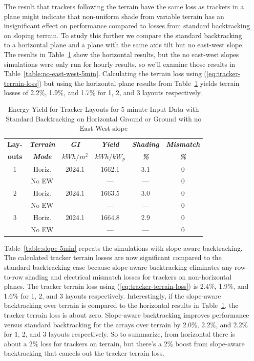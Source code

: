 \documentclass[conference]{IEEEtran}
\begin{document}
The result that trackers following the terrain have the same loss as trackers in a plane might indicate that non-uniform shade from variable terrain has an insignificant effect on performance compared to losses from standard backtracking on sloping terrain. To study this further we compare the standard backtracking to a horizontal plane and a plane with the same axis tilt but no east-west slope. The results in Table~\ref{table:horizontal-5min} show the horizontal results, but the no east-west slopes simulations were only run for hourly results, so we'll examine those results in Table~\ref{table:no-east-west-5min}. Calculating the terrain loss using (\ref{eq:tracker-terrain-loss}) but using the horizontal plane results from Table~\ref{table:horizontal-5min} yields terrain losses of 2.2\%, 1.9\%, and 1.7\% for 1, 2, and 3 layouts respectively.

\begin{table}[htbp]
\caption{Energy Yield for Tracker Layouts for 5-minute Input Data with Standard Backtracking on Horizontal Ground or Ground with no East-West slope}
\begin{center}
\begin{tabular}{|c|c|c|c|c|c|}
\hline
\textbf{Lay-}& \textbf{\textit{Terrain}}& \textbf{\textit{GI}}&        \textbf{\textit{Yield}}&        \textbf{\textit{Shading}}& \textbf{\textit{Mismatch}} \\
\textbf{outs}& \textbf{\textit{Mode}}&    \textbf{\textit{$kWh/m^2$}}& \textbf{\textit{$kWh / kW_p$}}& \textbf{\textit{\%}}&      \textbf{\textit{\%}} \\
\hline
1& Horiz.& 2024.1&  1662.1& 3.1& 0 \\
 & No EW &       &     ---& ---& 0 \\
\hline
2& Horiz.& 2024.1&  1663.5& 3.0& 0 \\
 & No EW &       &     ---& ---& 0 \\
\hline
3& Horiz.& 2024.1&  1664.8& 2.9& 0 \\
 & No EW &       &     ---& ---& 0 \\
\hline
\end{tabular}
\label{table:horizontal-5min}
\end{center}
\end{table}

Table~\ref{table:slope-5min} repeats the simulations with slope-aware backtracking. The calculated tracker terrain losses are now significant compared to the standard backtracking case because slope-aware backtracking eliminates any row-to-row shading and electrical mismatch losses for trackers on non-horizontal planes. The tracker terrain loss using (\ref{eq:tracker-terrain-loss}) is 2.4\%, 1.9\%, and 1.6\% for 1, 2, and 3 layouts respectively. Interestingly, if the slope-aware backtracking over terrain is compared to the horizontal results in Table~\ref{table:horizontal-5min}, the tracker terrain loss is about zero. Slope-aware backtracking improves performance versus standard backtracking for the arrays over terrain by 2.0\%, 2.2\%, and 2.2\% for 1, 2, and 3 layouts respectively. So to summarize, from horizontal there is about a 2\% loss for trackers on terrain, but there's a 2\% boost from slope-aware backtracking that cancels out the tracker terrain loss.
\end{document}
